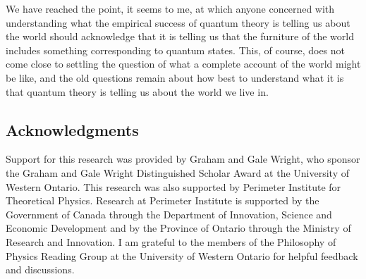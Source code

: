 \documentclass[12pt]{article}
\begin{document}
We have reached the point, it seems to me, at which anyone concerned with understanding what the empirical success of quantum theory is telling us about the world should acknowledge that it is telling us that the furniture of the world includes something  corresponding to quantum states.  This, of course, does not come close to settling the question of what a complete account of the world might be like, and the old questions remain about how best to understand what it is that quantum theory is telling us about the world we live in.

\subsection*{Acknowledgments}
Support for this research was provided by Graham and Gale Wright, who sponsor the Graham and Gale Wright Distinguished Scholar Award at the University of Western Ontario. This research was also supported by Perimeter Institute for Theoretical Physics. Research at Perimeter Institute is supported by the Government of Canada through the Department of Innovation, Science and Economic Development and by the Province of Ontario through the Ministry of Research and Innovation. I am grateful to the members of the Philosophy of Physics Reading Group at the University of Western Ontario for helpful feedback and discussions.
\end{document}
